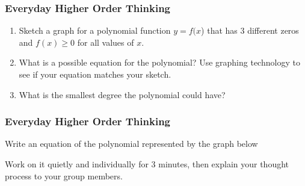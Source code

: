 \documentclass[10pt, aspectratio=169]{beamer}
\newcommand{\ehot}{\frametitle{Everyday Higher Order Thinking}}
\begin{document}
\begin{frame}
\frametitle{Everyday Higher Order Thinking}
\begin{enumerate}[leftmargin = *, label = \arabic*]
\item
Sketch a graph for a polynomial function $y = f(x$) that has $3$ different zeros and $f(x) \geq 0$ for
all values of $x$.

\item
What is a possible equation for the polynomial? Use graphing technology to see if your
equation matches your sketch.

\item
What is the smallest degree the polynomial could have?

\end{enumerate}
\end{frame}

\begin{frame}
\ehot
Write an equation of the polynomial represented by the graph below
\begin{center}
\normalsize
{}
\end{center}
Work on it quietly and individually for 3 minutes, then explain your thought process to your group members.
\end{frame}
\end{document}
